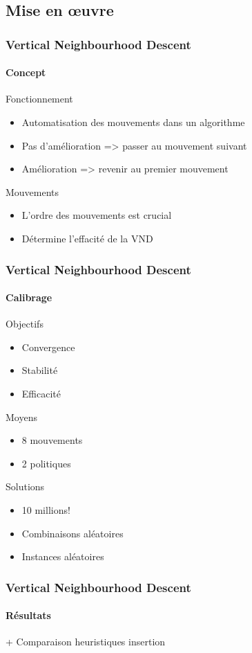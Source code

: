 \subsection{Mise en \oe uvre}
\begin{frame}
	\frametitle{Vertical Neighbourhood Descent}
	\framesubtitle{Concept}
	\begin{block}{Fonctionnement}
		\begin{itemize}
			\item Automatisation des mouvements dans un algorithme
			\item Pas d'amélioration => passer au mouvement suivant
			\item Amélioration => revenir au premier mouvement
		\end{itemize}
	\end{block}
	\vspace*{1em}
	\begin{block}{Mouvements}
		\begin{itemize}
			\item L'ordre des mouvements est crucial
			\item Détermine l'effacité de la VND
		\end{itemize}
	\end{block}
\end{frame}
\begin{frame}
	\frametitle{Vertical Neighbourhood Descent}
	\framesubtitle{Calibrage}
	\begin{alertblock}{Objectifs}
		\begin{itemize}
			\item Convergence
			\item Stabilité
			\item Efficacité
		\end{itemize}
	\end{alertblock}
	\begin{block}{Moyens}
		\begin{itemize}
			\item 8 mouvements
			\item 2 politiques
		\end{itemize}
	\end{block}
	\begin{exampleblock}{Solutions}
		\begin{itemize}
			\item 10 millions!
			\item Combinaisons aléatoires
			\item Instances aléatoires
		\end{itemize}
	\end{exampleblock}
\end{frame}
\begin{frame}
	\frametitle{Vertical Neighbourhood Descent}
	\framesubtitle{Résultats}
	+ Comparaison heuristiques insertion
\end{frame}
